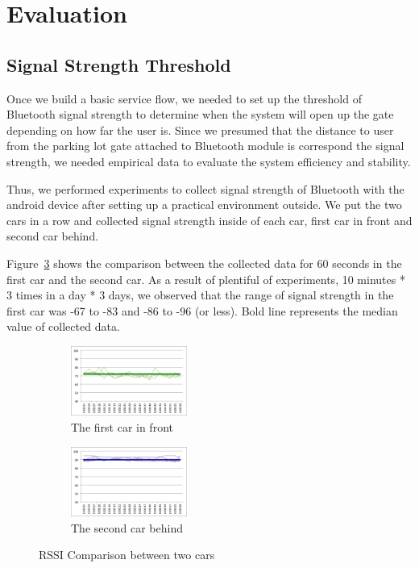\section{Evaluation}
\subsection{Signal Strength Threshold}
Once we build a basic service flow, we needed to set up the threshold of Bluetooth signal strength to determine when the system will open up the gate depending on how far the user is. Since we presumed that the distance to user from the parking lot gate attached to Bluetooth module is correspond the signal strength, we needed empirical data to evaluate the system efficiency and stability.

Thus, we performed experiments to collect signal strength of Bluetooth with the android device after setting up a practical environment outside. We put the two cars in a row and collected signal strength inside of each car, first car in front and second car behind.

Figure~\ref{fig:comparison} shows the comparison between the collected data for 60 seconds in the first car and the second car. As a result of plentiful of experiments, 10 minutes * 3 times in a day * 3 days, we observed that the range of signal strength in the first car was -67 to -83 and -86 to -96 (or less). Bold line represents the median value of collected data.

\begin{figure}
	\centering
	\begin{subfigure}[b]{.5\linewidth}
		\centering
		\includegraphics[width=1.5in]{figure/bt_first_car}
		\caption{The first car in front}
		\label{fig:first car}
	\end{subfigure}%
	\begin{subfigure}[b]{.5\linewidth}
		\centering
		\includegraphics[width=1.5in]{figure/bt_second_car}
		\caption{The second car behind}
		\label{fig:second car}
	\end{subfigure}
	\caption{RSSI Comparison between two cars}
	\label{fig:comparison}
\end{figure}


